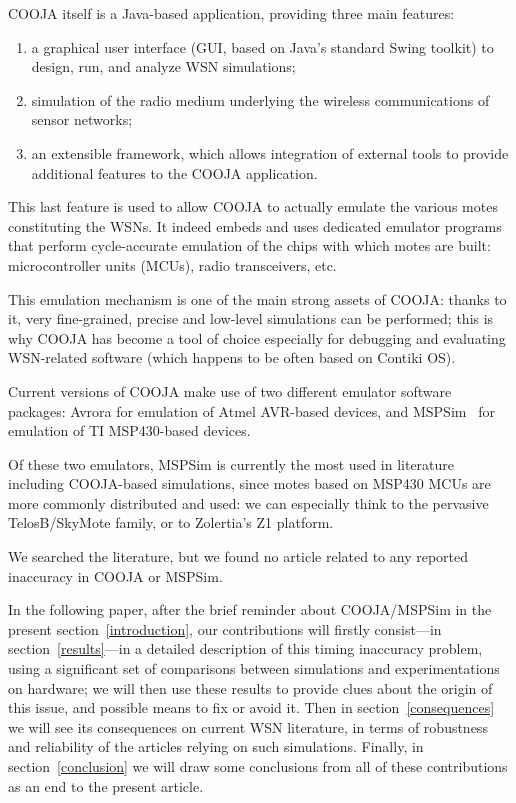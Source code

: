 \documentclass[10pt,final,journal,twocolumn]{IEEEtran}
\begin{document}
COOJA itself is a Java-based application, providing three main features:
\begin{enumerate}
\item a graphical user interface (GUI, based on Java's standard Swing toolkit)
to design, run, and analyze WSN simulations;
\item simulation of the radio medium underlying the wireless communications
of sensor networks;
\item an extensible framework, which allows integration of external tools
to provide additional features to the COOJA application.
\end{enumerate}
This last feature is used to allow COOJA to actually emulate the various
motes constituting the WSNs. It indeed embeds and uses dedicated emulator
programs that perform cycle-accurate emulation of the chips with which motes
are built: microcontroller units (MCUs), radio transceivers, etc.

This emulation mechanism is one of the main strong assets of COOJA:
thanks to it, very fine-grained, precise and low-level simulations
can be performed; this is why COOJA has become a tool of choice especially
for debugging and evaluating WSN-related software (which happens to be
often based on Contiki OS).

Current versions of COOJA make use of two different emulator software
packages: Avrora for emulation of Atmel AVR-based devices, and
MSPSim~\cite{MSPSim} for emulation of TI MSP430-based devices.

Of these two emulators, MSPSim is currently the most used in literature
including COOJA-based simulations, since motes based on MSP430 MCUs are
more commonly distributed and used: we can especially think to the pervasive
TelosB/SkyMote family, or to Zolertia's Z1 platform.

We searched the literature, but we found no article related to any reported
inaccuracy in COOJA or MSPSim.

In the following paper, after the brief reminder about COOJA/MSPSim in the
present section~\ref{introduction}, our contributions will firstly
consist---in section~\ref{results}---in a detailed description of this
timing inaccuracy problem, using a significant set of comparisons between
simulations and experimentations on hardware; we will then use these results
to provide clues about the origin of this issue, and possible means to fix
or avoid it.
Then in section~\ref{consequences} we will see its consequences on current
WSN literature, in terms of robustness and reliability of the articles
relying on such simulations. Finally, in section~\ref{conclusion}
we will draw some conclusions from all of these contributions as an end
to the present article.
\end{document}
